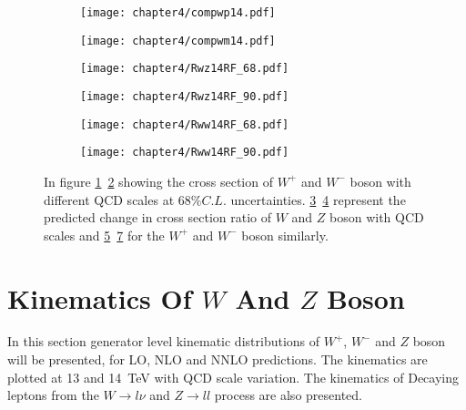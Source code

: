 \documentclass[a4paper,12pt]{report}
\numberwithin{equation}{section}
\begin{document}
\begin{figure}[H]
\centering
\begin{subfigure}{0.48\textwidth}
\texttt{[image: chapter4/compwp14.pdf]}
\vspace*{-8mm}
\caption{}
\label{wp14rf}
\end{subfigure}
\begin{subfigure}{0.49\textwidth}
\texttt{[image: chapter4/compwm14.pdf]}
\vspace*{-8mm}
\caption{}
\label{wm14rf}
\end{subfigure}
\begin{subfigure}{0.49\textwidth}
\texttt{[image: chapter4/Rwz14RF\_68.pdf]}
\vspace*{-8mm}
\caption{}
\label{rwz14rf}
\end{subfigure}
\begin{subfigure}{0.49\textwidth}
\texttt{[image: chapter4/Rwz14RF\_90.pdf]}
\vspace*{-8mm}
\caption{}
\label{rwz14rf1}
\end{subfigure}
\begin{subfigure}{0.49\textwidth}
\texttt{[image: chapter4/Rww14RF\_68.pdf]}
\vspace*{-8mm}
\caption{}
\label{rww14rf}
\end{subfigure}
\begin{subfigure}{0.49\textwidth}
\texttt{[image: chapter4/Rww14RF\_90.pdf]}
\vspace*{-8mm}
\caption{}
\label{rww14rf1}
\end{subfigure}
\caption{In figure \ref{wp14rf}~\ref{wm14rf} showing the cross section of $W^{+}$ and $W^{-}$ boson with different QCD scales at $68\%C.L.$ uncertainties. \ref{rwz14rf}~\ref{rwz14rf1} represent the predicted change in cross section ratio of $W$ and $Z$ boson with QCD scales and \ref{rww14rf}~\ref{rww14rf1} for the $W^{+}$ and $W^{-}$ boson similarly.} 
\end{figure}


\section{Kinematics Of $W$ And $Z$ Boson}
In this section generator level kinematic distributions of $W^{+}$, $W^{-}$ and $Z$ boson will be presented, for LO, NLO and NNLO predictions. The kinematics are plotted at 13 and 14~TeV with QCD scale variation. The kinematics of Decaying leptons from the $W\rightarrow l\nu$ and $Z\rightarrow ll$ process are also presented.
\end{document}
